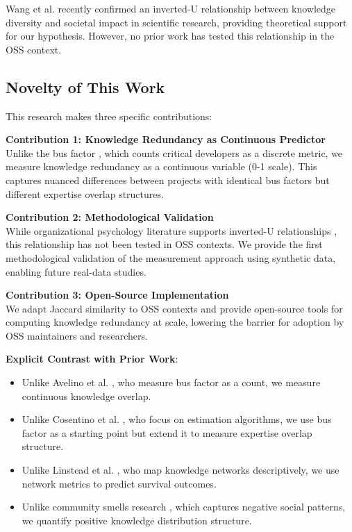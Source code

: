 \documentclass[11pt,letterpaper]{article}
\begin{document}
Wang et al. \cite{Wang2022} recently confirmed an inverted-U relationship between knowledge diversity and societal impact in scientific research, providing theoretical support for our hypothesis. However, no prior work has tested this relationship in the OSS context.

\subsection{Novelty of This Work}

This research makes three specific contributions:

\textbf{Contribution 1: Knowledge Redundancy as Continuous Predictor}\\
Unlike the bus factor \cite{Avelino2016, Cosentino2015}, which counts critical developers as a discrete metric, we measure knowledge redundancy as a continuous variable (0-1 scale). This captures nuanced differences between projects with identical bus factors but different expertise overlap structures.

\textbf{Contribution 2: Methodological Validation}\\
While organizational psychology literature supports inverted-U relationships \cite{VanKnippenberg2007, Wang2022}, this relationship has not been tested in OSS contexts. We provide the first methodological validation of the measurement approach using synthetic data, enabling future real-data studies.

\textbf{Contribution 3: Open-Source Implementation}\\
We adapt Jaccard similarity \cite{Cooke2000} to OSS contexts and provide open-source tools for computing knowledge redundancy at scale, lowering the barrier for adoption by OSS maintainers and researchers.

\textbf{Explicit Contrast with Prior Work}:
\begin{itemize}
    \item Unlike Avelino et al. \cite{Avelino2019}, who measure bus factor as a count, we measure continuous knowledge overlap.
    \item Unlike Cosentino et al. \cite{Cosentino2015}, who focus on estimation algorithms, we use bus factor as a starting point but extend it to measure expertise overlap structure.
    \item Unlike Linstead et al. \cite{Linstead2017}, who map knowledge networks descriptively, we use network metrics to predict survival outcomes.
    \item Unlike community smells research \cite{Ahammed2021}, which captures negative social patterns, we quantify positive knowledge distribution structure.
\end{itemize}
\end{document}
